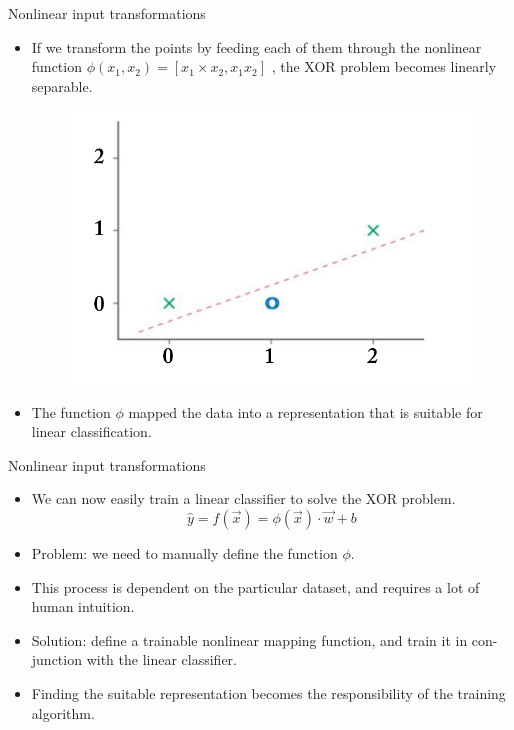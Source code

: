 \documentclass[handout]{beamer}
\begin{document}
\begin{frame}{Nonlinear input transformations}
\begin{scriptsize}
\begin{itemize}
\item If we transform the points by feeding each of them through the nonlinear function $\phi(x_1,x_2) = [x_1 \times x_2, x_1 x_2 ]$ , the XOR problem becomes linearly separable.
\begin{figure}[htb]
	\centering
	 \includegraphics[scale=0.25]{pics/xor2.png}
\end{figure}

\item The function $\phi$ mapped the data into a representation that is suitable for linear classification.

\end{itemize}
\end{scriptsize}
\end{frame}


\begin{frame}{Nonlinear input transformations}
\begin{scriptsize}
\begin{itemize}
\item We can now easily train a linear classifier to solve the XOR problem.
\begin{equation}
 \hat{y} = f(\vec{x}) = \phi(\vec{x}) \cdot \vec{w} +b
\end{equation}
\item Problem: we need to manually define the function $\phi$.
\item This process is dependent on the particular dataset, and requires a lot of human intuition.
\item Solution: define a trainable nonlinear mapping function, and train it in con-
junction with the linear classifier.
\item Finding the suitable representation becomes the responsibility of the training algorithm.
\end{itemize}
\end{scriptsize}
\end{frame}
\end{document}
